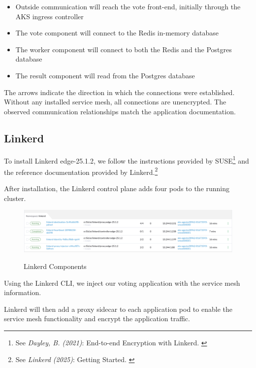 \begin{itemize}
    \item Outside communication will reach the vote front-end, initially through the AKS ingress controller
    \item The vote component will connect to the Redis in-memory database
    \item The worker component will connect to both the Redis and the Postgres database
    \item The result component will read from the Postgres database
\end{itemize}

The arrows indicate the direction in which the connections were established. Without any installed service mesh, all connections are unencrypted. The observed communication relationships match the application documentation.

\subsection{Linkerd}

To install Linkerd edge-25.1.2, we follow the instructions provided by SUSE\footnote{See \textit{Dayley, B. (2021)}: End-to-end Encryption with Linkerd. \cite{installLinkerd}} and the reference documentation provided by Linkerd.\footnote{See \textit{Linkerd (2025)}: Getting Started. \cite{gettingStarted}}

After installation, the Linkerd control plane adds four pods to the running cluster.

\begin{figure}[H]
\centering
\caption {Linkerd Components}
\includegraphics[width=\linewidth]{images/linkerd-pods.png}
\label{fig:linkerdPods}
\end{figure}

Using the Linkerd CLI, we inject our voting application with the service mesh information.

Linkerd will then add a proxy sidecar to each application pod to enable the service mesh functionality and encrypt the application traffic.


